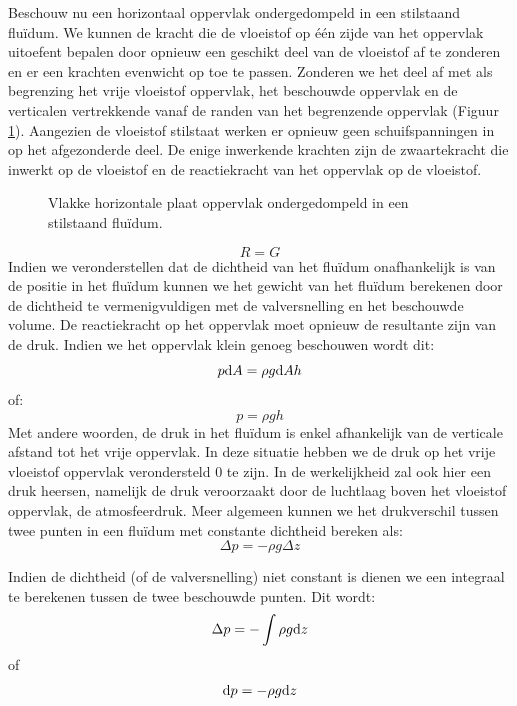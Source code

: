 Beschouw nu een horizontaal oppervlak ondergedompeld in een stilstaand fluïdum. We kunnen de kracht die de vloeistof op \'e\'en zijde van het oppervlak uitoefent bepalen door opnieuw een geschikt deel van de vloeistof af te zonderen en er een krachten evenwicht op toe te passen. Zonderen we het deel af met als begrenzing het vrije vloeistof oppervlak, het beschouwde oppervlak en de verticalen vertrekkende vanaf de randen van het begrenzende oppervlak (Figuur \ref{fig:oppervlak_in_stilstaande_vloeistof}). Aangezien de vloeistof stilstaat werken er opnieuw geen schuifspanningen in op het afgezonderde deel. De enige inwerkende krachten zijn de zwaartekracht die inwerkt op de vloeistof en de reactiekracht van het oppervlak op de vloeistof.
\begin{figure}[htb]
	\centering
	
	\caption{Vlakke horizontale plaat oppervlak ondergedompeld in een stilstaand fluïdum.}
	\label{fig:oppervlak_in_stilstaande_vloeistof}
\end{figure}
\begin{equation}
	 R = G
\end{equation}
Indien we veronderstellen dat de dichtheid van het fluïdum onafhankelijk is van de positie in het fluïdum kunnen we het gewicht van het fluïdum berekenen door de dichtheid te vermenigvuldigen met de valversnelling en het beschouwde volume. De reactiekracht op het oppervlak moet opnieuw de resultante zijn van de druk. Indien we het oppervlak klein genoeg beschouwen wordt dit:
\begin{equation}
	 p \mathrm{d} A = \rho g \mathrm{d} A h
\end{equation}
of:
\begin{equation}
	 p = \rho g h
\end{equation}
Met andere woorden, de druk in het fluïdum is enkel afhankelijk van de verticale afstand tot het vrije oppervlak. In deze situatie hebben we de druk op het vrije vloeistof oppervlak verondersteld 0 te zijn. In de werkelijkheid zal ook hier een druk heersen, namelijk de druk veroorzaakt door de luchtlaag boven het vloeistof oppervlak, de atmosfeerdruk. Meer algemeen kunnen we het drukverschil tussen twee punten in een fluïdum met constante dichtheid bereken als:
\begin{equation}
	\Delta p = -\rho g \Delta z
\end{equation}

Indien de dichtheid (of de valversnelling) niet constant is dienen we een integraal te berekenen tussen de twee beschouwde punten. Dit wordt:
\begin{equation}
	\Delta p = -\int \rho g \mathrm{d} z
\end{equation}
of
\begin{equation}
	\mathrm{d} p = -\rho g \mathrm{d} z
\end{equation}


